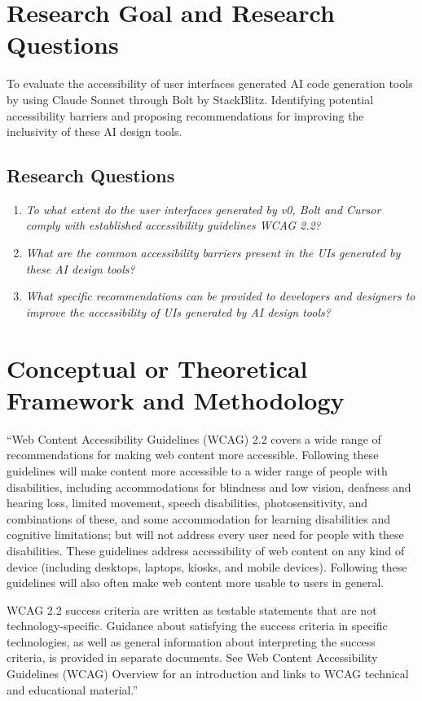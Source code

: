 \documentclass{article}
\begin{document}
\section{Research Goal and Research Questions}
To evaluate the accessibility of user interfaces generated AI code generation tools by using Claude Sonnet through Bolt by StackBlitz.
Identifying potential accessibility barriers and proposing recommendations for improving the inclusivity of these AI design tools.

\subsection{Research Questions}

\begin{enumerate}
  \item \textit{To what extent do the user interfaces generated by v0, Bolt and Cursor comply with established accessibility guidelines WCAG 2.2?}
  \item \textit{What are the common accessibility barriers present in the UIs generated by these AI design tools?}
  \item \textit{What specific recommendations can be provided to developers and designers to improve the accessibility of UIs generated by AI design tools?}
\end{enumerate}

\section{Conceptual or Theoretical Framework and Methodology}
“Web Content Accessibility Guidelines (WCAG) 2.2 covers a wide range of recommendations for making web content more accessible.
Following these guidelines will make content more accessible to a wider range of people with disabilities,
including accommodations for blindness and low vision, deafness and hearing loss, limited movement, speech disabilities, photosensitivity,
and combinations of these, and some accommodation for learning disabilities and cognitive limitations;
but will not address every user need for people with these disabilities.
These guidelines address accessibility of web content on any kind of device (including desktops, laptops, kiosks, and mobile devices).
Following these guidelines will also often make web content more usable to users in general.

WCAG 2.2 success criteria are written as testable statements that are not technology-specific.
Guidance about satisfying the success criteria in specific technologies,
as well as general information about interpreting the success criteria, is provided in separate documents.
See Web Content Accessibility Guidelines (WCAG) Overview for an introduction and links to WCAG technical and educational material.” \cite{wcag_2.2}
\end{document}
